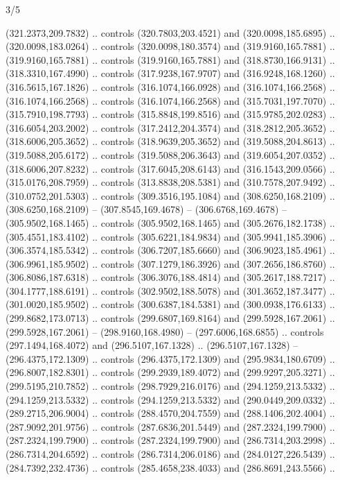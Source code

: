 \begin{flagdescription}{3/5}
\begin{scope}[xshift=0.5\flaglength,yshift=0.5\flagwidth,scale=\flagwidth/270]
\begin{scope}[y=0.8pt, x=0.8pt, yscale=-1,shift={(-281.25,-168.75)}]
  (321.2373,209.7832) .. controls (320.7803,203.4521) and (320.0098,185.6895) ..
  (320.0098,183.0264) .. controls (320.0098,180.3574) and (319.9160,165.7881) ..
  (319.9160,165.7881) .. controls (319.9160,165.7881) and (318.8730,166.9131) ..
  (318.3310,167.4990) .. controls (317.9238,167.9707) and (316.9248,168.1260) ..
  (316.5615,167.1826) .. controls (316.1074,166.0928) and (316.1074,166.2568) ..
  (316.1074,166.2568) .. controls (316.1074,166.2568) and (315.7031,197.7070) ..
  (315.7910,198.7793) .. controls (315.8848,199.8516) and (315.9785,202.0283) ..
  (316.6054,203.2002) .. controls (317.2412,204.3574) and (318.2812,205.3652) ..
  (318.6006,205.3652) .. controls (318.9639,205.3652) and (319.5088,204.8613) ..
  (319.5088,205.6172) .. controls (319.5088,206.3643) and (319.6054,207.0352) ..
  (318.6006,207.8232) .. controls (317.6045,208.6143) and (316.1543,209.0566) ..
  (315.0176,208.7959) .. controls (313.8838,208.5381) and (310.7578,207.9492) ..
  (310.0752,201.5303) .. controls (309.3516,195.1084) and (308.6250,168.2109) ..
  (308.6250,168.2109) -- (307.8545,169.4678) -- (306.6768,169.4678) --
  (305.9502,168.1465) .. controls (305.9502,168.1465) and (305.2676,182.1738) ..
  (305.4551,183.4102) .. controls (305.6221,184.9834) and (305.9941,185.3906) ..
  (306.3574,185.5342) .. controls (306.7207,185.6660) and (306.9023,185.4961) ..
  (306.9961,185.9502) .. controls (307.1279,186.3926) and (307.2656,186.8760) ..
  (306.8086,187.6318) .. controls (306.3076,188.4814) and (305.2617,188.7217) ..
  (304.1777,188.6191) .. controls (302.9502,188.5078) and (301.3652,187.3477) ..
  (301.0020,185.9502) .. controls (300.6387,184.5381) and (300.0938,176.6133) ..
  (299.8682,173.0713) .. controls (299.6807,169.8164) and (299.5928,167.2061) ..
  (299.5928,167.2061) -- (298.9160,168.4980) -- (297.6006,168.6855) .. controls
  (297.1494,168.4072) and (296.5107,167.1328) .. (296.5107,167.1328) --
  (296.4375,172.1309) .. controls (296.4375,172.1309) and (295.9834,180.6709) ..
  (296.8007,182.8301) .. controls (299.2939,189.4072) and (299.9297,205.3271) ..
  (299.5195,210.7852) .. controls (298.7929,216.0176) and (294.1259,213.5332) ..
  (294.1259,213.5332) .. controls (294.1259,213.5332) and (290.0449,209.0332) ..
  (289.2715,206.9004) .. controls (288.4570,204.7559) and (288.1406,202.4004) ..
  (287.9092,201.9756) .. controls (287.6836,201.5449) and (287.2324,199.7900) ..
  (287.2324,199.7900) .. controls (287.2324,199.7900) and (286.7314,203.2998) ..
  (286.7314,204.6592) .. controls (286.7314,206.0186) and (284.0127,226.5439) ..
  (284.7392,232.4736) .. controls (285.4658,238.4033) and (286.8691,243.5566) ..

\end{scope}
\end{scope}
\end{flagdescription}
